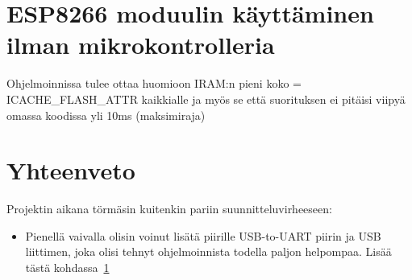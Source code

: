 \section{ESP8266 moduulin käyttäminen ilman mikrokontrolleria}
\label{sec:extra}

Ohjelmoinnissa tulee ottaa huomioon IRAM:n pieni koko = ICACHE\_FLASH\_ATTR
kaikkialle ja myös se että suorituksen ei pitäisi viipyä omassa koodissa yli
10ms (maksimiraja)

\section{Yhteenveto}

Projektin aikana törmäsin kuitenkin pariin suunnitteluvirheeseen:
\begin{itemize}
  \item Pienellä vaivalla olisin voinut lisätä piirille USB-to-UART piirin ja
    USB liittimen, joka olisi tehnyt ohjelmoinnista todella paljon helpompaa.
    Lisää tästä kohdassa~\ref{sec:extra}
\end{itemize}

